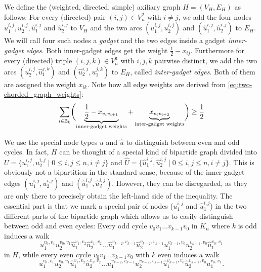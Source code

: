We define the (weighted, directed, simple) axiliary graph $H = (V_{H}, E_{H})$ as follows:
For every (directed) pair $(i,j) \in V_{n}^{2}$ with $i \neq j$, we add the four nodes $u_{1}^{i,j}, u_{2}^{i,j}, \hat{u}_{1}^{i,j}$ and $\hat{u}_{2}^{i,j}$ to $V_{H}$ 
and the two arcs $(u_{1}^{i,j}, u_{2}^{i,j})$ and $(\hat{u}_{1}^{i,j}, \hat{u}_{2}^{i,j})$ to $E_{H}$.
We will call four such nodes a \textit{gadget} and the two edges inside a gadget \textit{inner-gadget edges}.
Both inner-gadget edges get the weight $\frac{1}{2} - x_{ij}$.
Furthermore for every (directed) triple $(i,j,k) \in V_{n}^{3}$ with $i,j,k$ pairwise distinct, we add the two arcs $(u_{2}^{i,j}, \hat{u}_{1}^{j,k})$ and $(\hat{u}_{2}^{i,j}, u_{1}^{j,k})$ to $E_{H}$, called \textit{inter-gadget edges}.
Both of them are assigned the weight $x_{ik}$.
Note how all edge weights are derived from \cref{eq:two-chorded_graph_weights}:
\begin{equation*}
	\sum_{i \in \mathbb{Z}_k} \biggl( \underbrace{ \frac{1}{2} -x_{v_i v_{i+1}} }_{\text{inner-gadget weights}} + \underbrace{x_{v_i v_{i+2}}}_{\text{inter-gadget weights}} \biggr) \geq \frac{1}{2}
\end{equation*}

We use the special node types $u$ and $\hat{u}$ to distinguish between even and odd cycles.
In fact, $H$ can be thought of a special kind of bipartide graph divided into ${U = \big\{ u_{1}^{i,j}, u_{2}^{i,j} \mid 0 \leq i,j \leq n, i \neq j \big\}}$ and $\hat{U} = \big\{ \hat{u}_{1}^{i,j}, \hat{u}_{2}^{i,j} \mid 0 \leq i,j \leq n, i \neq j \big\}$.
This is obviously not a bipartition in the standard sense, because of the inner-gadget edges $(u_{1}^{i,j}, u_{2}^{i,j})$ and $(\hat{u}_{1}^{i,j}, \hat{u}_{2}^{i,j})$.
However, they can be disregarded, as they are only there to precisely obtain the left-hand side of the inequality.
The essential part is that we mark a special pair of nodes ($u_{1}^{i,j}$ and $\hat{u}_{1}^{i,j}$) in the two different parts of the bipartide graph which allows us to easily distinguish between odd and even cycles:
Every odd cycle $v_{0}v_{1} \ldots v_{k-1}v_{0}$ in $K_{n}$ where $k$ is odd induces a walk
\[
	u_{1}^{v_{0}, v_{1}}u_{2}^{v_{0}, v_{1}}\hat{u}_{1}^{v_{1}, v_{2}}\hat{u}_{2}^{v_{1}, v_{2}}
	\ldots
	\hat{u}_{1}^{v_{k-2}, v_{k-1}}\hat{u}_{2}^{v_{k-2}, v_{k-1}}u_{1}^{v_{k-1}, v_{0}}u_{2}^{v_{k-1}, v_{0}}\hat{u}_{1}^{v_{0}, v_{1}}
\]
in $H$, while every even cycle $v_{0}v_{1} \ldots v_{k-1}v_{0}$ with $k$ even induces a walk
\[
	u_{1}^{v_{0}, v_{1}}u_{2}^{v_{0}, v_{1}}\hat{u}_{1}^{v_{1}, v_{2}}\hat{u}_{2}^{v_{1}, v_{2}}
	\ldots
	u_{1}^{v_{k-2}, v_{k-1}}u_{2}^{v_{k-2}, v_{k-1}}\hat{u}_{1}^{v_{k-1}, v_{0}}\hat{u}_{2}^{v_{k-1}, v_{0}}u_{1}^{v_{0}, v_{1}}
.\]

